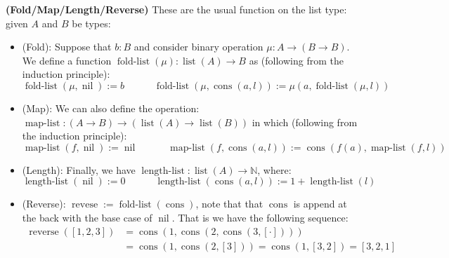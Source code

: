 \begin{definition}{\textbf{(Fold/Map/Length/Reverse)}}
    These are the usual function on the list type: given $A$ and $B$ be types:
    \begin{itemize}
        \item (Fold): Suppose that $b:B$ and consider binary operation $\mu:A\to(B\to B)$. We define a function $\operatorname{fold-list}(\mu):\operatorname{list}(A)\to B$ as (following from the induction principle):
        \begin{equation*}
            \operatorname{fold-list}(\mu, \operatorname{nil}):=b\qquad \quad \operatorname{fold-list}(\mu, \operatorname{cons}(a, l)):=\mu(a, \operatorname{fold-list}(\mu, l))
        \end{equation*}
        \item (Map): We can also define the operation: $\operatorname{map-list}:(A\to B)\to(\operatorname{list}(A)\to\operatorname{list}(B))$ in which (following from the induction principle):
        \begin{equation*}
            \operatorname{map-list}(f, \operatorname{nil}):=\operatorname{nil}\qquad\quad \operatorname{map-list}(f,\operatorname{cons}(a, l)):= \operatorname{cons}(f(a), \operatorname{map-list}(f, l)) 
        \end{equation*}
        \item (Length): Finally, we have $\operatorname{length-list}:\operatorname{list}(A)\to \mathbb{N}$, where:
        \begin{equation*}
            \operatorname{length-list}(\operatorname{nil}) := 0 \qquad \quad \operatorname{length-list}(\operatorname{cons}(a, l)) := 1 + \operatorname{length-list}(l)
        \end{equation*}
        \item (Reverse): $\operatorname{revese}:=\operatorname{fold-list}(\operatorname{cons})$, note that that $\operatorname{cons}$ is append at the back with the base case of $\operatorname{nil}$. That is we have the following sequence:
        \begin{equation*}
        \begin{aligned}
            \operatorname{reverse}([1, 2, 3])&=\operatorname{cons}(1, \operatorname{cons}(2, \operatorname{cons}(3, [\cdot])))\\
            &= \operatorname{cons}(1, \operatorname{cons}(2, [3]))=\operatorname{cons}(1, [3, 2])=[3,2,1]
        \end{aligned}
        \end{equation*}
    \end{itemize}
\end{definition}


